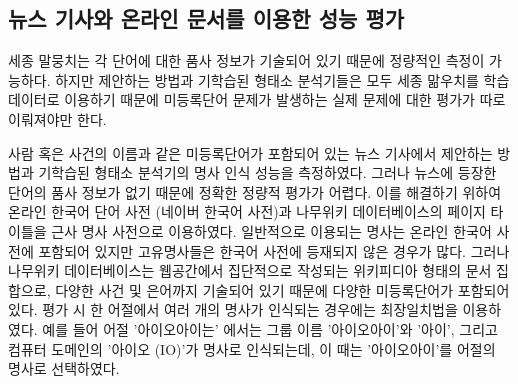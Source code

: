 \documentclass[oneside, ko,phd]{snuthesis_utf8_kor}
\begin{document}
\begin{table}[ht]
\small
\centering
\caption{세종 말뭉치에서 명사로 추출된 빈도수가 작은 12 개의 명사 예시 (로지스틱 리그레션의 판별 확률, 출현 빈도수)}
\label{tab:sejong_infrequent}
\end{table}

\begin{table}[ht]
\small
\centering
\caption{세종 말뭉치에서 명사로 추출된 12 개의 명사 예시 (정렬 기준 = 판별 확률 $\times$ 출현 빈도수)}
\label{tab:sejong_frequent}
\end{table}


\subsection{뉴스 기사와 온라인 문서를 이용한 성능 평가}

세종 말뭉치는 각 단어에 대한 품사 정보가 기술되어 있기 때문에 정량적인 측정이 가능하다.
하지만 제안하는 방법과 기학습된 형태소 분석기들은 모두 세종 맒우치를 학습 데이터로 이용하기 때문에 미등록단어 문제가 발생하는 실제 문제에 대한 평가가 따로 이뤄져야만 한다.

사람 혹은 사건의 이름과 같은 미등록단어가 포함되어 있는 뉴스 기사에서 제안하는 방법과 기학습된 형태소 분석기의 명사 인식 성능을 측정하였다.
그러나 뉴스에 등장한 단어의 품사 정보가 없기 때문에 정확한 정량적 평가가 어렵다.
이를 해결하기 위하여 온라인 한국어 단어 사전 (네이버 한국어 사전)과 나무위키 데이터베이스의 페이지 타이틀을 근사 명사 사전으로 이용하였다.
일반적으로 이용되는 명사는 온라인 한국어 사전에 포함되어 있지만 고유명사들은 한국어 사전에 등재되지 않은 경우가 많다.
그러나 나무위키 데이터베이스는 웹공간에서 집단적으로 작성되는 위키피디아 형태의 문서 집합으로, 다양한 사건 및 은어까지 기술되어 있기 때문에 다양한 미등록단어가 포함되어 있다.
평가 시 한 어절에서 여러 개의 명사가 인식되는 경우에는 최장일치법을 이용하였다.
예를 들어 어절 '아이오아이는' 에서는 그룹 이름 '아이오아이'와 '아이', 그리고 컴퓨터 도메인의 '아이오 (IO)'가 명사로 인식되는데, 이 때는 '아이오아이'를 어절의 명사로 선택하였다.
\end{document}
